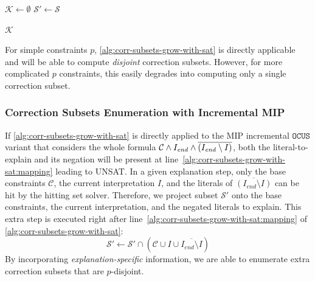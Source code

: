 \documentclass[twoside,11pt]{article}
\newcommand\m[1]{\mathcal{#1}}
\newcommand\subsetT{\ensuremath{\m{S} }\xspace}
\newcommand\Iend{\ensuremath{I_\mathit{end} }\xspace}
\newcommand\formula{\ensuremath{\m{F} }\xspace}
\newcommand\formulac{\ensuremath{\m{C} }\xspace}
\newcommand\mm[1]{\ensuremath{#1}\xspace}
\newcommand\call[1]{\mm{\texttt{#1}}}
\newcommand\sat{\texttt{{SAT}}\xspace}
\newcommand\grow{\mm{\call{Grow}}}
\newcommand\comus{\mm{\call{OCUS}}}
\newcommand\corrsubsets{\mm{\call{CorrSubsets}}}
\begin{document}
\begin{algorithm}[!h]
	\DontPrintSemicolon
	$\m{K} \gets \emptyset$\;
	$\subsetT' \gets  \subsetT$ \label{alg:disjmcs:init} \;
	
	\While{$\sat(\m{S}')$}{
		C $\gets  \formula \setminus \grow(\m{S}', \formula)$ \label{alg:corr-subsets-grow-with-sat:corr-subset}\;
		$ \m{S}' \gets \m{S}' \ \cup $ C \label{alg:corr-subsets-grow-with-sat:mapping}\;
		$ \m{K} \gets \m{K} \ \cup \{$C$\}$\;
	}
	\Return $\m{K}$
	\caption{$\corrsubsets(\subsetT, \formula)$ }
	\label{alg:corr-subsets-grow-with-sat}
\end{algorithm}

For simple constraints $p$, \cref{alg:corr-subsets-grow-with-sat} is directly applicable and will be able to compute \emph{disjoint} correction subsets.
However, for more complicated $p$ constraints, this easily degrades into computing only a single correction subset. 



\subsubsection{Correction Subsets Enumeration with Incremental MIP} If \cref{alg:corr-subsets-grow-with-sat} is directly applied to the MIP incremental \comus variant that considers the whole formula $\formulac\land \textbf{\Iend} \land \overline{(\Iend\setminus I)}$, both the literal-to-explain and its negation will be present at line~\ref{alg:corr-subsets-grow-with-sat:mapping} leading to UNSAT. In a given explanation step, only the base constraints $\formulac$, the current interpretation $I$, and the literals of $\overline{(\Iend\setminus I)}$ can be hit by the hitting set solver.  
Therefore, we project subset $\m{S'}$ onto the base constraints, the current interpretation, and the negated literals to explain. This extra step is executed right after line~\ref{alg:corr-subsets-grow-with-sat:mapping} of \cref{alg:corr-subsets-grow-with-sat}:
\[ \m{S}' \gets \m{S}'  \cap (\formulac \cup I \cup \overline{\Iend \setminus I}) \]
By incorporating \emph{explanation-specific} information, we are able to enumerate extra correction subsets that are $p$-disjoint.
\end{document}
